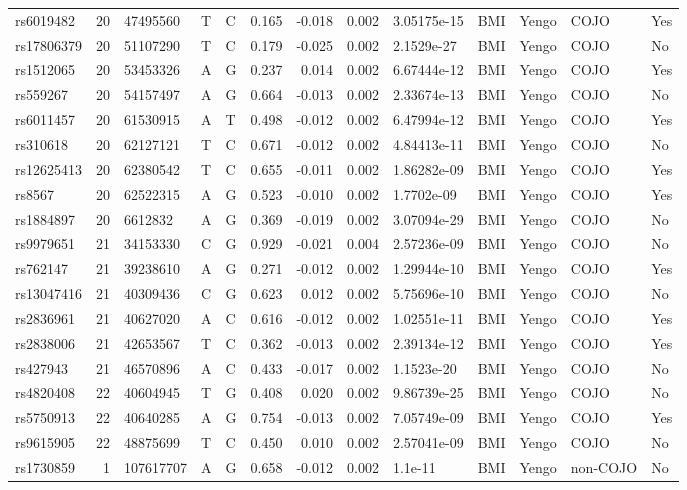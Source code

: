 \documentclass[11pt,twoside]{bristolthesis}
\begin{document}
\begin{longtable}[t]{lrlllrrrlllll}
rs6019482 & 20 & 47495560 & T & C & 0.165 & -0.018 & 0.002 & 3.05175e-15 & BMI & Yengo & COJO & Yes\\
rs17806379 & 20 & 51107290 & T & C & 0.179 & -0.025 & 0.002 & 2.1529e-27 & BMI & Yengo & COJO & No\\
\addlinespace
rs1512065 & 20 & 53453326 & A & G & 0.237 & 0.014 & 0.002 & 6.67444e-12 & BMI & Yengo & COJO & Yes\\
rs559267 & 20 & 54157497 & A & G & 0.664 & -0.013 & 0.002 & 2.33674e-13 & BMI & Yengo & COJO & No\\
rs6011457 & 20 & 61530915 & A & T & 0.498 & -0.012 & 0.002 & 6.47994e-12 & BMI & Yengo & COJO & Yes\\
rs310618 & 20 & 62127121 & T & C & 0.671 & -0.012 & 0.002 & 4.84413e-11 & BMI & Yengo & COJO & No\\
rs12625413 & 20 & 62380542 & T & C & 0.655 & -0.011 & 0.002 & 1.86282e-09 & BMI & Yengo & COJO & Yes\\
\addlinespace
rs8567 & 20 & 62522315 & A & G & 0.523 & -0.010 & 0.002 & 1.7702e-09 & BMI & Yengo & COJO & Yes\\
rs1884897 & 20 & 6612832 & A & G & 0.369 & -0.019 & 0.002 & 3.07094e-29 & BMI & Yengo & COJO & No\\
rs9979651 & 21 & 34153330 & C & G & 0.929 & -0.021 & 0.004 & 2.57236e-09 & BMI & Yengo & COJO & No\\
rs762147 & 21 & 39238610 & A & G & 0.271 & -0.012 & 0.002 & 1.29944e-10 & BMI & Yengo & COJO & Yes\\
rs13047416 & 21 & 40309436 & C & G & 0.623 & 0.012 & 0.002 & 5.75696e-10 & BMI & Yengo & COJO & No\\
\addlinespace
rs2836961 & 21 & 40627020 & A & C & 0.616 & -0.012 & 0.002 & 1.02551e-11 & BMI & Yengo & COJO & Yes\\
rs2838006 & 21 & 42653567 & T & C & 0.362 & -0.013 & 0.002 & 2.39134e-12 & BMI & Yengo & COJO & Yes\\
rs427943 & 21 & 46570896 & A & C & 0.433 & -0.017 & 0.002 & 1.1523e-20 & BMI & Yengo & COJO & No\\
rs4820408 & 22 & 40604945 & T & G & 0.408 & 0.020 & 0.002 & 9.86739e-25 & BMI & Yengo & COJO & No\\
rs5750913 & 22 & 40640285 & A & G & 0.754 & -0.013 & 0.002 & 7.05749e-09 & BMI & Yengo & COJO & Yes\\
\addlinespace
rs9615905 & 22 & 48875699 & T & C & 0.450 & 0.010 & 0.002 & 2.57041e-09 & BMI & Yengo & COJO & No\\
rs1730859 & 1 & 107617707 & A & G & 0.658 & -0.012 & 0.002 & 1.1e-11 & BMI & Yengo & non-COJO & No\\

\end{longtable}
\end{document}
